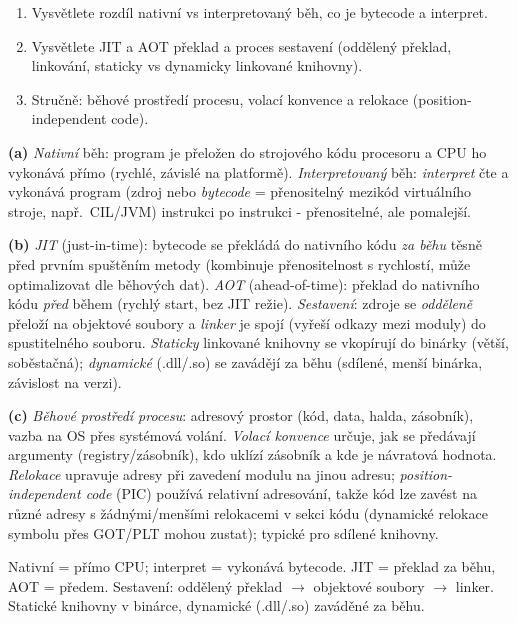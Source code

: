 \begin{zadani}
\begin{enumerate}[label=(\alph*)]
  \item {} Vysvětlete rozdíl nativní vs interpretovaný běh, co je bytecode a interpret.
  \item {} Vysvětlete JIT a AOT překlad a proces sestavení (oddělený překlad, linkování, staticky vs dynamicky linkované knihovny).
  \item {} Stručně: běhové prostředí procesu, volací konvence a relokace (position-independent code).
\end{enumerate}
\end{zadani}

\begin{reseni}
\textbf{(a)} \emph{Nativní} běh: program je přeložen do strojového kódu procesoru a CPU ho vykonává přímo (rychlé, závislé na platformě). \emph{Interpretovaný} běh: \emph{interpret} čte a vykonává program (zdroj nebo \emph{bytecode} = přenositelný mezikód virtuálního stroje, např.\ CIL/JVM) instrukci po instrukci - přenositelné, ale pomalejší.

\textbf{(b)} \emph{JIT} (just-in-time): bytecode se překládá do nativního kódu \emph{za běhu} těsně před prvním spuštěním metody (kombinuje přenositelnost s rychlostí, může optimalizovat dle běhových dat). \emph{AOT} (ahead-of-time): překlad do nativního kódu \emph{před} během (rychlý start, bez JIT režie). \emph{Sestavení}: zdroje se \emph{odděleně} přeloží na objektové soubory a \emph{linker} je spojí (vyřeší odkazy mezi moduly) do spustitelného souboru. \emph{Staticky} linkované knihovny se vkopírují do binárky (větší, soběstačná); \emph{dynamické} (.dll/.so) se zavádějí za běhu (sdílené, menší binárka, závislost na verzi).

\textbf{(c)} \emph{Běhové prostředí procesu}: adresový prostor (kód, data, halda, zásobník), vazba na OS přes systémová volání. \emph{Volací konvence} určuje, jak se předávají argumenty (registry/zásobník), kdo uklízí zásobník a kde je návratová hodnota. \emph{Relokace} upravuje adresy při zavedení modulu na jinou adresu; \emph{position-independent code} (PIC) používá relativní adresování, takže kód lze zavést na různé adresy s žádnými/menšími relokacemi v sekci kódu (dynamické relokace symbolu přes GOT/PLT mohou zustat); typické pro sdílené knihovny.
\end{reseni}

\begin{jadro}
Nativní = přímo CPU; interpret = vykonává bytecode. JIT = překlad za běhu, AOT = předem. Sestavení: oddělený překlad $\to$ objektové soubory $\to$ linker. Statické knihovny v binárce, dynamické (.dll/.so) zaváděné za běhu.
\end{jadro}


